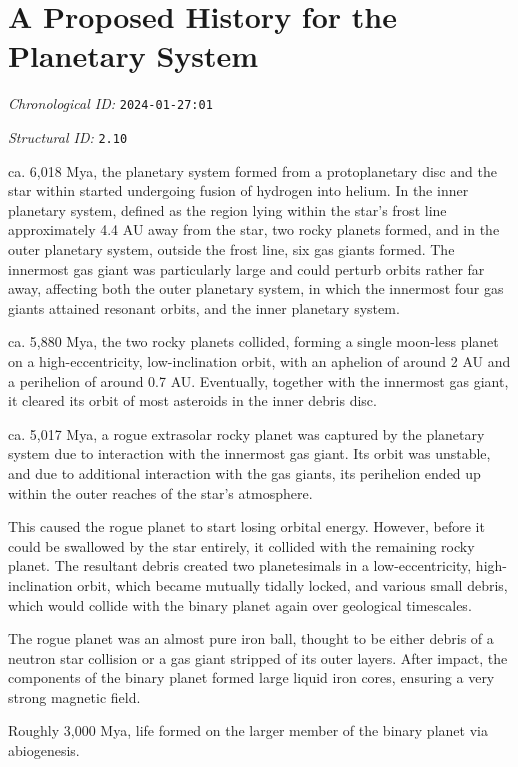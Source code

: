 \section{A Proposed History for the Planetary System}
\emph{Chronological ID:} \texttt{2024-01-27:01}

\emph{Structural ID:} \texttt{2.10}

ca. 6,018 Mya, the planetary system formed from a protoplanetary disc and the star within started undergoing fusion of hydrogen into helium. In the inner planetary system, defined as the region lying within the star's frost line approximately 4.4 AU away from the star, two rocky planets formed, and in the outer planetary system, outside the frost line, six gas giants formed. The innermost gas giant was particularly large and could perturb orbits rather far away, affecting both the outer planetary system, in which the innermost four gas giants attained resonant orbits, and the inner planetary system.

ca. 5,880 Mya, the two rocky planets collided, forming a single moon-less planet on a high-eccentricity, low-inclination orbit, with an aphelion of around 2 AU and a perihelion of around 0.7 AU. Eventually, together with the innermost gas giant, it cleared its orbit of most asteroids in the inner debris disc.

ca. 5,017 Mya, a rogue extrasolar rocky planet was captured by the planetary system due to interaction with the innermost gas giant. Its orbit was unstable, and due to additional interaction with the gas giants, its perihelion ended up within the outer reaches of the star's atmosphere.

This caused the rogue planet to start losing orbital energy. However, before it could be swallowed by the star entirely, it collided with the remaining rocky planet. The resultant debris created two planetesimals in a low-eccentricity, high-inclination orbit, which became mutually tidally locked, and various small debris, which would collide with the binary planet again over geological timescales.

The rogue planet was an almost pure iron ball, thought to be either debris of a neutron star collision or a gas giant stripped of its outer layers. After impact, the components of the binary planet formed large liquid iron cores, ensuring a very strong magnetic field.

Roughly 3,000 Mya, life formed on the larger member of the binary planet via abiogenesis.
\newpage
